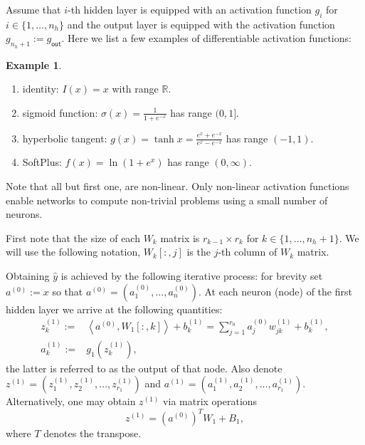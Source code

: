 \documentclass[12pt]{amsart}
\theoremstyle{remark}
\theoremstyle{definition}
\newtheorem{example}[theorem]{Example}
\numberwithin{equation}{section}
\begin{document}
Assume that $i$-th hidden layer is equipped with an activation function $g_i$ for $i \in \{1, \ldots, n_h\}$ and the output layer is equipped with the activation function $g_{n_h+1}:=g_{\mathsf{out}}$. Here we list a few examples of differentiable activation functions: 
\begin{example}\enskip 
	\begin{enumerate}
		\item identity: $I(x)=x$ with range $\mathbb{R}$.
		\item sigmoid function: $\sigma(x) = \frac{1}{1+e^{-x}}$ has range $(0, 1]$.
		\item hyperbolic tangent:  $g(x) = \tanh{x} = \frac{e^x + e^{-x}}{e^{x}-e^{-x}}$ has range $(-1, 1)$.
		\item SoftPlus: $f(x) = \ln(1+e^x)$ has range $(0, \infty)$.
	\end{enumerate}
Note that all but first one, are non-linear. Only non-linear activation functions enable networks to compute non-trivial problems using a small number of neurons. 
\end{example}



First note that the size of each $W_{k}$ matrix is $r_{k-1} \times r_{k}$ for $k \in \{1, \ldots, n_h+1\}$. We will use the following notation, $W_k[:, j]$ is the $j$-th column of $W_{k}$ matrix. 

Obtaining $\widehat{y}$ is achieved by the following iterative process:
\noindent for brevity set $a^{(0)} := x$ so that $a^{(0)} = (a^{(0)}_1, \ldots, a^{(0)}_{n})$. At each neuron (node) of the first hidden layer we arrive at the following quantities:
\begin{align*}
z_k^{(1)} :=& \left< a^{(0)}, W_{1}[:, k]\right> + b_k^{(1)} = \sum_{j=1}^{r_0} a_{j}^{(0)}w_{jk}^{(1)} +  b_k^{(1)},\\
a_k^{(1)} :=& g_{1}(z_k^{(1)}),
\end{align*}
the latter is referred to as the output of that node.
Also denote 
$z^{(1)} = (z_1^{(1)}, z_2^{(1)},\ldots, z_{r_1}^{(1)})$ and $a^{(1)} = (a_1^{(1)}, a_2^{(1)},\ldots, a_{r_1}^{(1)})$.
Alternatively, one may obtain $z^{(1)}$ via matrix operations
$$z^{(1)} = {(a^{(0)})}^T W_1 + B_1,$$
where $T$ denotes the transpose. 
\end{document}
